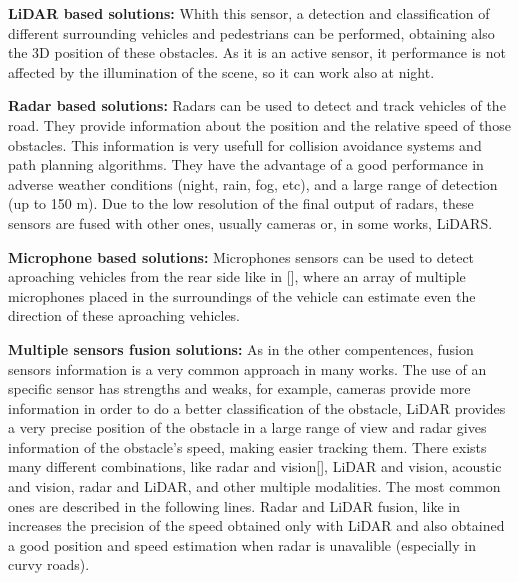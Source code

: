 \textbf{LiDAR based solutions:}
Whith this sensor, a detection and classification of different surrounding vehicles and pedestrians can be performed, obtaining also the 3D position of these obstacles. As it is an active sensor, it performance is not affected by the illumination of the scene, so it can work also at night. 

\textbf{Radar based solutions:}
Radars can be used to detect and track vehicles of the road. They provide information about the position and the relative speed of those obstacles. This information is very usefull for collision avoidance systems and path planning algorithms. They have the advantage of a good performance in adverse weather conditions (night, rain, fog, etc), and a large range of detection (up to 150 m)\cite{blanc2004obstacle}. Due to the low resolution of the final output of radars, these sensors are fused with other ones, usually cameras\cite{garcia2012data} or, in some works, LiDARS\cite{gohring2011radar}.

\textbf{Microphone based solutions:}
Microphones sensors can be used to detect aproaching vehicles from the rear side like in [], where an array of multiple microphones placed in the surroundings of the vehicle can estimate even the direction of these aproaching vehicles.


\textbf{Multiple sensors fusion solutions:}
As in the other compentences, fusion sensors information is a very common approach in many works. The use of an specific sensor has strengths and weaks, for example, cameras provide more information in order to do a better classification of the obstacle, LiDAR provides a very precise position of the obstacle in a large range of view and radar gives information of the obstacle's speed, making easier tracking them.
There exists many different combinations, like radar and vision[], LiDAR and vision, acoustic and vision, radar and LiDAR, and other multiple modalities. The most common ones are described in the following lines.
Radar and LiDAR fusion, like in \cite{gohring2011radar} increases the precision of the speed obtained only with LiDAR and also obtained a good position and speed estimation when radar is unavalible (especially in curvy roads).